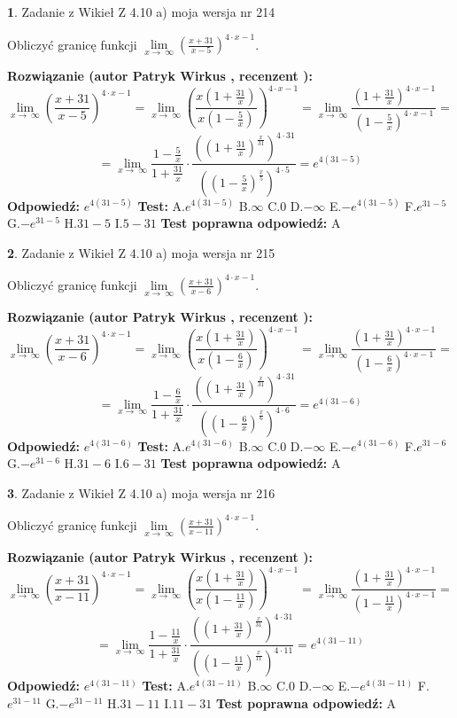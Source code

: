 \documentclass[12pt, a4paper]{article}
\theoremstyle{definition} %
\newtheorem{zad}{}
\newcommand{\zadStart}[1]{\begin{zad}#1\newline}
\newcommand{\zadStop}{\end{zad}}
\newcommand{\rozwStart}[2]{\noindent \textbf{Rozwiązanie (autor #1 , recenzent #2): }\newline}
\newcommand{\rozwStop}{\newline}
\newcommand{\odpStart}{\noindent \textbf{Odpowiedź:}\newline}
\newcommand{\odpStop}{\newline}
\newcommand{\testStart}{\noindent \textbf{Test:}\newline}
\newcommand{\testStop}{\newline}
\newcommand{\kluczStart}{\noindent \textbf{Test poprawna odpowiedź:}\newline}
\newcommand{\kluczStop}{\newline}
\begin{document}
\zadStart{Zadanie z Wikieł Z 4.10 a) moja wersja nr 214}


Obliczyć granicę funkcji  $\lim\limits_{x\to\ \infty}(\frac{x+31}{x-5})^{4\cdot x-1}$.
\zadStop
\rozwStart{Patryk Wirkus}{}
$$\lim\limits_{x\to\ \infty}(\frac{x+31}{x-5})^{4\cdot x-1} = \lim\limits_{x\to\ \infty}(\frac{x(1+\frac{31}{x})}{x(1-\frac{5}{x})})^{4\cdot x-1}=\lim\limits_{x\to\ \infty}\frac{(1+\frac{31}{x})^{4\cdot x-1}}{(1-\frac{5}{x})^{4\cdot x-1}}=$$
$$=\lim\limits_{x\to\ \infty}\frac{1-\frac{5}{x}}{1+\frac{31}{x}}\cdot\frac{((1+\frac{31}{x})^{\frac{x}{31}})^{4\cdot31}}{((1-\frac{5}{x})^{\frac{x}{5}})^{4\cdot5}}=e^{4(31-5)}$$
\rozwStop
\odpStart
$e^{4(31-5)}$
\odpStop
\testStart
A.$e^{4(31-5)}$ B.$\infty$ C.$0$ D.$-\infty$ E.$-e^{4(31-5)}$
F.$e^{31-5}$ G.$-e^{31-5}$
H.$31-5$
I.$5-31$
\testStop
\kluczStart
A
\kluczStop



\zadStart{Zadanie z Wikieł Z 4.10 a) moja wersja nr 215}


Obliczyć granicę funkcji  $\lim\limits_{x\to\ \infty}(\frac{x+31}{x-6})^{4\cdot x-1}$.
\zadStop
\rozwStart{Patryk Wirkus}{}
$$\lim\limits_{x\to\ \infty}(\frac{x+31}{x-6})^{4\cdot x-1} = \lim\limits_{x\to\ \infty}(\frac{x(1+\frac{31}{x})}{x(1-\frac{6}{x})})^{4\cdot x-1}=\lim\limits_{x\to\ \infty}\frac{(1+\frac{31}{x})^{4\cdot x-1}}{(1-\frac{6}{x})^{4\cdot x-1}}=$$
$$=\lim\limits_{x\to\ \infty}\frac{1-\frac{6}{x}}{1+\frac{31}{x}}\cdot\frac{((1+\frac{31}{x})^{\frac{x}{31}})^{4\cdot31}}{((1-\frac{6}{x})^{\frac{x}{6}})^{4\cdot6}}=e^{4(31-6)}$$
\rozwStop
\odpStart
$e^{4(31-6)}$
\odpStop
\testStart
A.$e^{4(31-6)}$ B.$\infty$ C.$0$ D.$-\infty$ E.$-e^{4(31-6)}$
F.$e^{31-6}$ G.$-e^{31-6}$
H.$31-6$
I.$6-31$
\testStop
\kluczStart
A
\kluczStop



\zadStart{Zadanie z Wikieł Z 4.10 a) moja wersja nr 216}


Obliczyć granicę funkcji  $\lim\limits_{x\to\ \infty}(\frac{x+31}{x-11})^{4\cdot x-1}$.
\zadStop
\rozwStart{Patryk Wirkus}{}
$$\lim\limits_{x\to\ \infty}(\frac{x+31}{x-11})^{4\cdot x-1} = \lim\limits_{x\to\ \infty}(\frac{x(1+\frac{31}{x})}{x(1-\frac{11}{x})})^{4\cdot x-1}=\lim\limits_{x\to\ \infty}\frac{(1+\frac{31}{x})^{4\cdot x-1}}{(1-\frac{11}{x})^{4\cdot x-1}}=$$
$$=\lim\limits_{x\to\ \infty}\frac{1-\frac{11}{x}}{1+\frac{31}{x}}\cdot\frac{((1+\frac{31}{x})^{\frac{x}{31}})^{4\cdot31}}{((1-\frac{11}{x})^{\frac{x}{11}})^{4\cdot11}}=e^{4(31-11)}$$
\rozwStop
\odpStart
$e^{4(31-11)}$
\odpStop
\testStart
A.$e^{4(31-11)}$ B.$\infty$ C.$0$ D.$-\infty$ E.$-e^{4(31-11)}$
F.$e^{31-11}$ G.$-e^{31-11}$
H.$31-11$
I.$11-31$
\testStop
\kluczStart
A
\kluczStop
\end{document}
